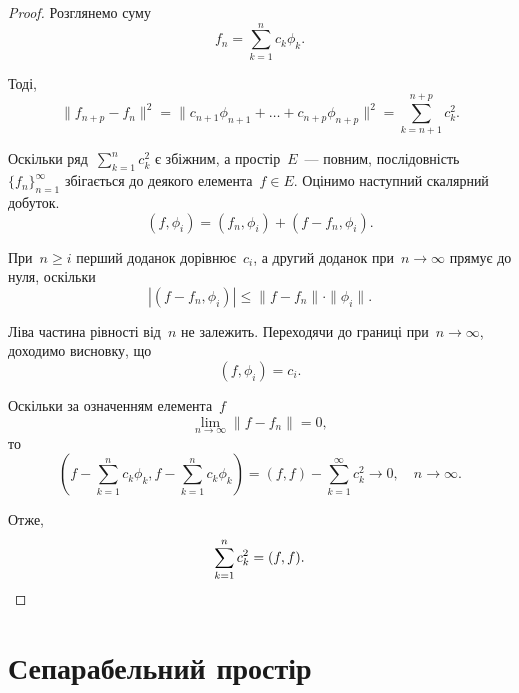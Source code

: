 \begin{proof}
    Розглянемо суму
    \begin{equation*}
        f_n = \sum_{k = 1}^n c_k \phi_k.
    \end{equation*}
    
    Тоді,
    \begin{equation*}
        \|f_{n + p} - f_n\|^2 =
        \|c_{n + 1} \phi_{n + 1} + \dots + c_{n + p} \phi_{n + p}\|^2 =
        \sum_{k = n + 1}^{n + p} c_k^2.
    \end{equation*}

    Оскільки ряд~$\sum_{k = 1}^n c_k^2$ є збіжним, а простір~$E$~--- повним, послідовність~$\{f_n\}_{n = 1}^\infty$ збігається до деякого елемента~$f \in E$. Оцінимо наступний скалярний добуток.
    \begin{equation*}
        (f, \phi_i) = (f_n, \phi_i) + (f - f_n, \phi_i).
    \end{equation*}
    
    При~$n \ge i$ перший доданок дорівнює~$c_i$, а другий доданок при~$n \to \infty$ прямує до нуля, оскільки
    \begin{equation*}
        |(f - f_n, \phi_i)| \le \|f - f_n\| \cdot \|\phi_i\|.
    \end{equation*}
    
    Ліва частина рівності від~$n$ не залежить. Переходячи до границі при~$n \to \infty$, доходимо висновку, що
    \begin{equation*}
        (f, \phi_i) = c_i.
    \end{equation*}
    
    Оскільки за означенням елемента~$f$
    \begin{equation*}
        \lim_{n \to \infty} \|f - f_n\| = 0,
    \end{equation*}
    то
    \begin{equation*}
        \left( f - \sum_{k =1}^n c_k \phi_k, f - \sum_{k =1}^n c_k \phi_k \right) =
        (f, f) - \sum_{k = 1}^\infty c_k^2 \to 0, \quad n \to \infty.
    \end{equation*}
    
    Отже,
    \begin{equation*}
        \sum_{k = 1}^n c_k^2 = (f, f). \qedhere
    \end{equation*}
\end{proof}

\section{Сепарабельний простір}

